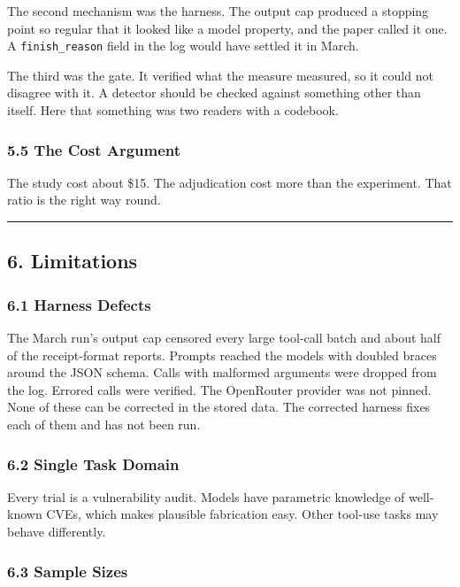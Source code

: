 \documentclass[
]{article}
\begin{document}
The second mechanism was the harness. The output cap produced a stopping
point so regular that it looked like a model property, and the paper
called it one. A \texttt{finish\_reason} field in the log would have
settled it in March.

The third was the gate. It verified what the measure measured, so it
could not disagree with it. A detector should be checked against
something other than itself. Here that something was two readers with a
codebook.

\subsubsection{5.5 The Cost Argument}\label{the-cost-argument}

The study cost about \$15. The adjudication cost more than the
experiment. That ratio is the right way round.

\begin{center}\rule{0.5\linewidth}{0.5pt}\end{center}

\subsection{6. Limitations}\label{limitations}

\subsubsection{6.1 Harness Defects}\label{harness-defects}

The March run's output cap censored every large tool-call batch and
about half of the receipt-format reports. Prompts reached the models
with doubled braces around the JSON schema. Calls with malformed
arguments were dropped from the log. Errored calls were verified. The
OpenRouter provider was not pinned. None of these can be corrected in
the stored data. The corrected harness fixes each of them and has not
been run.

\subsubsection{6.2 Single Task Domain}\label{single-task-domain}

Every trial is a vulnerability audit. Models have parametric knowledge
of well-known CVEs, which makes plausible fabrication easy. Other
tool-use tasks may behave differently.

\subsubsection{6.3 Sample Sizes}\label{sample-sizes}
\end{document}
